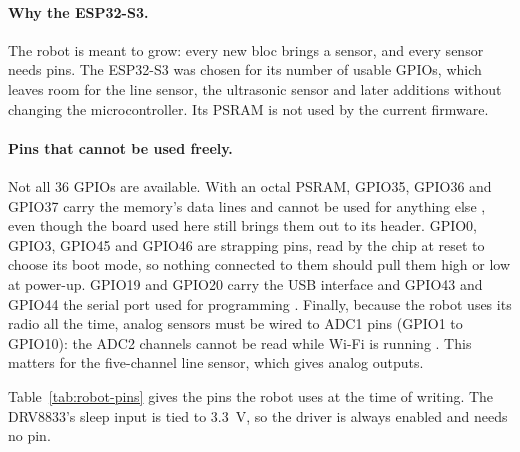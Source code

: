 \paragraph{Why the ESP32-S3.} The robot is meant to grow: every new bloc brings a sensor,
and every sensor needs pins. The ESP32-S3 was chosen for its number of usable GPIOs, which
leaves room for the line sensor, the ultrasonic sensor and later additions without
changing the microcontroller. Its PSRAM is not used by the current firmware.

\paragraph{Pins that cannot be used freely.} Not all 36 GPIOs are available. With an
octal PSRAM, GPIO35, GPIO36 and GPIO37 carry the memory's data lines and cannot be used
for anything else \cite{esp32s3_datasheet,esp32s3_wroom1_datasheet,esp32s3_devkitc1_guide},
even though the board used here still brings them out to its header.
GPIO0, GPIO3, GPIO45 and GPIO46 are strapping pins, read by the chip at reset to choose
its boot mode, so nothing connected to them should pull them high or low at power-up.
GPIO19 and GPIO20 carry the USB interface and GPIO43 and GPIO44 the serial port used for
programming \cite{esp32s3_datasheet}. Finally, because the robot uses its radio all the
time, analog sensors must be wired to ADC1 pins (GPIO1 to GPIO10): the ADC2 channels
cannot be read while Wi-Fi is running \cite{esp32s3_datasheet}. This matters for the
five-channel line sensor, which gives analog outputs.

Table~\ref{tab:robot-pins} gives the pins the robot uses at the time of writing. The
DRV8833's sleep input is tied to 3.3~V, so the driver is always enabled and needs no pin.


